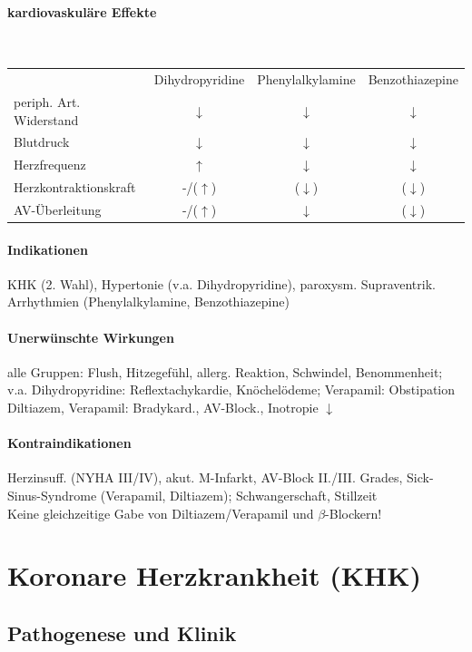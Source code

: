 \documentclass[10pt,a4paper]{report}
\begin{document}
\paragraph{kardiovaskuläre Effekte} \mbox{} \\
 
\begin{tabularx}{\textwidth}{Xccc}
&Dihydropyridine&Phenylalkylamine&Benzothiazepine\\
periph. Art. Widerstand	&$\downarrow$&$\downarrow$&$\downarrow$\\
Blutdruck&$\downarrow$&$\downarrow$&$\downarrow$\\
Herzfrequenz&$\uparrow$&$\downarrow$&$\downarrow$\\
Herzkontraktionskraft&-/($\uparrow$)&($\downarrow$)&($\downarrow$)\\
AV-Überleitung&-/($\uparrow$)&$\downarrow$&($\downarrow$)\\
\end{tabularx}

\paragraph{Indikationen}
KHK (2. Wahl), Hypertonie (v.a. Dihydropyridine), paroxysm. Supraventrik. Arrhythmien (Phenylalkylamine, Benzothiazepine)

\paragraph{Unerwünschte Wirkungen} alle Gruppen: Flush, Hitzegefühl, allerg. Reaktion, Schwindel, Benommenheit; v.a. Dihydropyridine: Reflextachykardie, Knöchelödeme; Verapamil: Obstipation Diltiazem, Verapamil:  Bradykard., AV-Block., Inotropie $\downarrow$

\paragraph{Kontraindikationen} Herzinsuff. (NYHA III/IV), akut. M-Infarkt, AV-Block II./III. Grades, Sick-Sinus-Syndrome (Verapamil, Diltiazem); Schwangerschaft, Stillzeit\\
Keine gleichzeitige Gabe von Diltiazem/Verapamil und $\beta$-Blockern!

\section{Koronare Herzkrankheit (KHK)}
\subsection{Pathogenese und Klinik}
\end{document}
